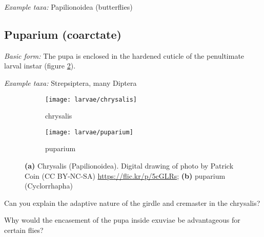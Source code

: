 \noindent{}\textit{Example taxa:} Papilionoidea (butterflies)\vspace{3mm}

\subsection{Puparium (coarctate)}
\noindent{}\textit{Basic form:} The pupa is enclosed in the hardened cuticle of the penultimate larval instar (figure \ref{fig:puparium}).\vspace{3mm}

\noindent{}\textit{Example taxa:} Strepsiptera, many Diptera\vspace{3mm}

\begin{figure}[ht!]
    \centering
    \begin{subfigure}[ht!]{0.4\textwidth}
      \centering
        \texttt{[image: larvae/chrysalis]}
        \caption{chrysalis}
        \label{fig:chrysalis}
    \end{subfigure}
    \hfill
    \begin{subfigure}[ht!]{0.45\textwidth}
        \texttt{[image: larvae/puparium]}
        \caption{puparium}
        \label{fig:puparium}
    \end{subfigure}
    \caption{\textbf{(a)} Chrysalis (Papilionoidea). Digital drawing of photo by Patrick Coin (CC BY-NC-SA) \url{https://flic.kr/p/5cGLRs}; \textbf{(b)} puparium (Cyclorrhapha) \citep[redrawn from][Plate XXX, Fig. 5]{bhlitem82061AustrInsect}}\label{fig:pupae123}
\end{figure}

\begin{theo}
{}Can you explain the adaptive nature of the girdle and cremaster in the chrysalis?\vspace{3mm}

\noindent{}Why would the encasement of the pupa inside exuviae be advantageous for certain flies?
\end{theo}

\clearpage
\thispagestyle{empty}